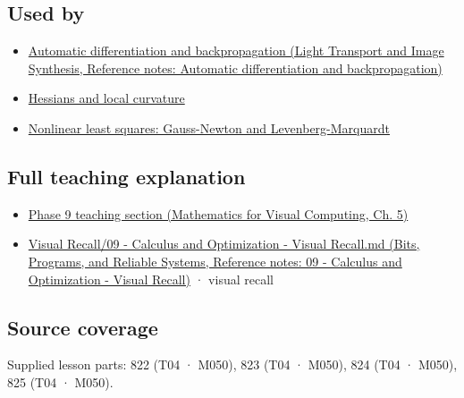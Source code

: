 \subsection{Used by}\label{appendix-d8a7ddb675eb-used-by}

\hypertarget{appendix-d8a7ddb675eb-used-by}{}

\begin{itemize}
\tightlist
\item
  \href{../04-Light-Transport-and-Image-Synthesis/main.pdf\#nameddest=appendix-40df0855b4a7}{Automatic differentiation and backpropagation (Light Transport and Image Synthesis, Reference notes: Automatic differentiation and backpropagation)}
\item
  \hyperref[appendix-6ac071f8b50c]{Hessians and local curvature}
\item
  \hyperref[appendix-2c2df8345991]{Nonlinear least squares: Gauss-Newton and Levenberg-Marquardt}
\end{itemize}

\subsection{Full teaching explanation}\label{appendix-d8a7ddb675eb-full-teaching-explanation}

\hypertarget{appendix-d8a7ddb675eb-full-teaching-explanation}{}

\begin{itemize}
\tightlist
\item
  \href{../02-Mathematics-for-Visual-Computing/main.pdf\#nameddest=02-foundations-ii-ch021-jacobians-curvature-and-local-approximation}{Phase 9 teaching section (Mathematics for Visual Computing, Ch. 5)}
\item
  \href{../01-Bits-Programs-and-Reliable-Systems/main.pdf\#nameddest=appendix-adf48f5dc5c1}{Visual Recall/09 - Calculus and Optimization - Visual Recall.md (Bits, Programs, and Reliable Systems, Reference notes: 09 - Calculus and Optimization - Visual Recall)} · visual recall
\end{itemize}

\subsection{Source coverage}\label{appendix-d8a7ddb675eb-source-coverage}

\hypertarget{appendix-d8a7ddb675eb-source-coverage}{}

Supplied lesson parts: 822 (T04 · M050), 823 (T04 · M050), 824 (T04 · M050), 825 (T04 · M050).
